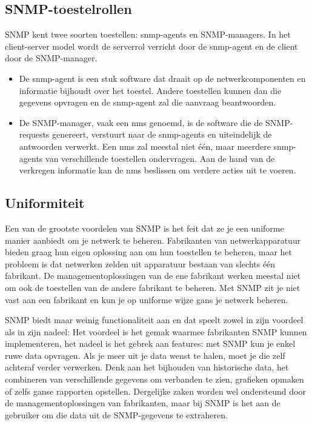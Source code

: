 \subsection{SNMP-toestelrollen}
\label{snmp-rollen}

SNMP kent twee soorten toestellen: \glspl{snmp-agent} en SNMP-managers.
In het client-server model wordt de serverrol verricht door de \gls{snmp-agent} en de client door de SNMP-manager.

\begin{itemize}
	\item De \gls{snmp-agent} is een stuk software dat draait op de netwerkcomponenten en informatie bijhoudt over het toestel.
	Andere toestellen kunnen dan die gegevens opvragen en de \gls{snmp-agent} zal die aanvraag beantwoorden.
	
	\item De SNMP-manager, vaak een  \gls{nms} genoemd, is de software die de SNMP-requests genereert, verstuurt naar de
	\glspl{snmp-agent} en uiteindelijk de antwoorden verwerkt. Een \gls{nms} zal meestal niet één, maar meerdere \glspl{snmp-agent} van verschillende toestellen ondervragen.
	Aan de hand van de verkregen informatie kan de \gls{nms} beslissen om verdere acties uit te voeren.
\end{itemize}


\subsection{Uniformiteit}

Een van de grootste voordelen van SNMP is het feit dat ze je een uniforme manier aanbiedt om je netwerk te beheren. Fabrikanten van netwerkapparatuur
bieden graag hun eigen oplossing aan om hun toestellen te beheren, maar het probleem is dat netwerken zelden uit apparatuur
bestaan van slechts één fabrikant. De managementoplossingen van de ene fabrikant werken meestal niet om ook de toestellen van de andere
fabrikant te beheren. Met SNMP zit je niet vast aan een fabrikant en kun je op uniforme wijze gans je netwerk beheren.

SNMP biedt maar weinig functionaliteit aan en dat speelt zowel in zijn voordeel als in zijn nadeel:
Het voordeel is het gemak waarmee fabrikanten SNMP kunnen implementeren,
het nadeel is het gebrek aan features: met SNMP kun je enkel ruwe data opvragen.
Als je meer uit je data wenst te halen, moet je die zelf achteraf verder verwerken. Denk aan het bijhouden van historische data, het combineren
van verschillende gegevens om verbanden te zien, grafieken opmaken of zelfs ganse rapporten opstellen. Dergelijke zaken worden wel ondersteund door de
managementoplossingen van fabrikanten, maar bij SNMP is het aan de gebruiker om die data uit de SNMP-gegevens te extraheren.


